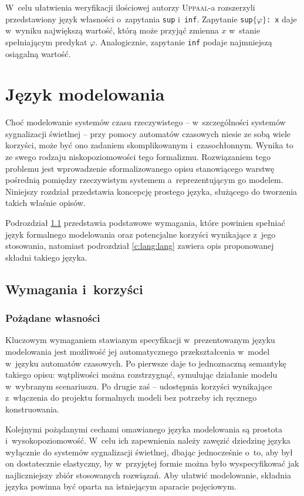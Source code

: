 \documentclass{pracamgr}
\newcommand{\upp}{\textsc{Uppaal}}
\theoremstyle{plain}
\begin{document}
W~celu ułatwienia weryfikacji ilościowej autorzy \upp-a rozszerzyli
przedstawiony język własności o~zapytania \texttt{sup} i~\texttt{inf}.
Zapytanie \texttt{sup$\{\varphi\}$: x} daje w~wyniku największą wartość,
którą może przyjąć zmienna $x$ w~stanie spełniającym predykat $\varphi$.
Analogicznie, zapytanie \texttt{inf} podaje najmniejszą osiągalną wartość.

\chapter{Język modelowania}

Choć modelowanie systemów czasu rzeczywistego -- w~szczególności
systemów sygnalizacji świetlnej -- przy pomocy automatów czasowych
niesie ze sobą wiele korzyści, może być ono zadaniem skomplikowanym
i~czasochłonnym. Wynika to ze swego rodzaju niskopoziomowości tego
formalizmu. Rozwiązaniem tego problemu jest wprowadzenie
sformalizowanego opisu stanowiącego warstwę pośrednią pomiędzy
rzeczywistym systemem a~reprezentującym go modelem.  Niniejszy
rozdział przedstawia koncepcję prostego języka, służącego do tworzenia
takich właśnie opisów.

Podrozdział \ref{c:lang:req} przedstawia podstawowe wymagania, które
powinien spełniać język formalnego modelowania oraz potencjalne
korzyści wynikające z~jego stosowania, natomiast podrozdział
\ref{c:lang:lang} zawiera opis proponowanej składni takiego języka.

\section{Wymagania i~korzyści}
\label{c:lang:req}

\subsection{Pożądane własności}

Kluczowym wymaganiem stawianym specyfikacji w~prezentowanym języku
modelowania jest możliwość jej automatycznego przekształcenia w~model
w~języku automatów czasowych. Po pierwsze daje to jednoznaczną
semantykę takiego opisu: wątpliwości można rozstrzygnąć, symulując
działanie modelu w~wybranym scenariuszu. Po drugie zaś -- udostępnia
korzyści wynikające z~włączenia do projektu formalnych modeli bez
potrzeby ich ręcznego konstruowania.

Kolejnymi pożądanymi cechami omawianego języka modelowania są prostota
i~wysokopoziomowość. W~celu ich zapewnienia należy zawęzić dziedzinę
języka wyłącznie do systemów sygnalizacji świetlnej, dbając
jednocześnie o~to, aby był on dostatecznie elastyczny, by w~przyjętej
formie można było wyspecyfikować jak najliczniejszy zbiór stosowanych
rozwiązań. Aby ułatwić modelowanie, składnia języka powinna być oparta
na istniejącym aparacie pojęciowym.
\end{document}
